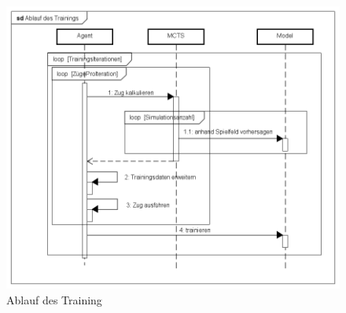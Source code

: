\documentclass[12pt,a4paper,bibliography=totocnumbered,listof=totocnumbered]{article}
\begin{document}
\begin{figure}[h]
\centering
\includegraphics[scale=0.4]{pics/training.png}
\caption{Ablauf des Training}
\label{abb:training-seq}
\end{figure}
\end{document}
